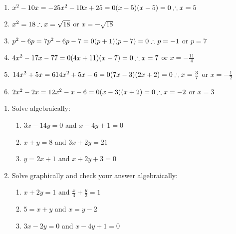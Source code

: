 \begin{solutions}{}
{\begin{enumerate}[itemsep=5pt, label=\textbf{\arabic*}. ]
\item ${x}^{2}-10x=-25\\ x^2-10x+25=0\\(x-5)(x-5)=0\\ \therefore  x=5$%
\item ${x}^{2}=18\\ \therefore x=\sqrt{18}$ or $x=-\sqrt{18}$%
\item ${p}^{2}-6p=7\\ p^2-6p-7=0\\(p+1)(p-7)=0\\ \therefore p=-1$ or $p=7$%
\item $4{x}^{2}-17x-77=0\\(4x+11)(x-7)=0\\ \therefore x=7$ or $x=-\frac{11}{4}$%
\item $14{x}^{2}+5x=6\\14x^2 +5x-6=0\\(7x-3)(2x+2)=0\\ \therefore  x=\frac{3}{7}$ or $x=-\frac{1}{2}$%
\item $2{x}^{2}-2x=12\\ x^2-x-6=0\\(x-3)(x+2)=0\\ \therefore x=-2$ or $x=3$%

\end{enumerate}}
\end{solutions}



\begin{exercises}{}
{
\begin{enumerate}[noitemsep, label=\textbf{\arabic*}. ] 
\item Solve algebraically: 
\begin{enumerate}[noitemsep, label=\textbf{(\alph*)} ] 
\item $3x-14y=0$ and $x-4y+1=0$
\item $x+y=8$ and $3x + 2y = 21$
\item $y=2x+1$ and $x + 2y + 3 = 0$
\end{enumerate}
\item Solve graphically and check your answer algebraically:
\begin{enumerate}[noitemsep, label=\textbf{(\alph*)} ] 
\item  $x+2y=1$ and $\frac{x}{3} + \frac{y}{2} = 1$
\item $5= x+y$ and $x = y-2$
\item $3x - 2y = 0$ and $x - 4y + 1 = 0$
\end{enumerate}
\end{enumerate}

}
\end{exercises}


